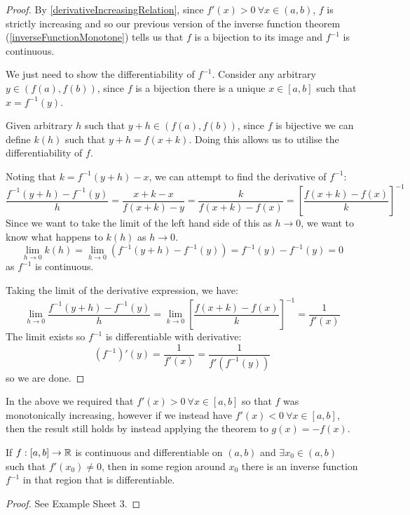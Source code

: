 \documentclass[../main.tex]{subfiles}
\begin{document}
\begin{proof}
  By \cref{derivativeIncreasingRelation}, since $f'(x) > 0\ \forall x \in (a, b)$, $f$ is strictly increasing and so our previous version of the inverse function theorem (\cref{inverseFunctionMonotone}) tells us that $f$ is a bijection to its image and $f^{-1}$ is continuous.

  We just need to show the differentiability of $f^{-1}$.
  Consider any arbitrary $y \in (f(a), f(b))$, since $f$ is a bijection there is a unique $x \in [a, b]$ such that $x = f^{-1}(y)$.

  Given arbitrary $h$ such that $y + h \in (f(a), f(b))$, since $f$ is bijective we can define $k(h)$ such that $y + h = f(x + k)$.
  Doing this allows us to utilise the differentiability of $f$.

  Noting that $k = f^{-1}(y + h) - x$, we can attempt to find the derivative of $f^{-1}$:
  \[
    \frac{f^{-1}(y + h) - f^{-1}(y)}{h} = \frac{x + k - x}{f(x + k) - y} = \frac{k}{f(x + k) - f(x)} = \left[\frac{f(x + k) - f(x)}{k}\right]^{-1}
  \]
  Since we want to take the limit of the left hand side of this as $h \to 0$, we want to know what happens to $k(h)$ as $h \to 0$.
  \[
    \lim_{h \to 0} k(h) = \lim_{h \to 0} (f^{-1}(y + h) - f^{-1}(y)) = f^{-1}(y) - f^{-1}(y) = 0
  \]
  as $f^{-1}$ is continuous.

  Taking the limit of the derivative expression, we have:
  \[
    \lim_{h \to 0} \frac{f^{-1}(y + h) - f^{-1}(y)}{h} = \lim_{k \to 0}  \left[\frac{f(x + k) - f(x)}{k}\right]^{-1} = \frac{1}{f'(x)}
  \]
  The limit exists so $f^{-1}$ is differentiable with derivative:
  \[
    (f^{-1})'(y) = \frac{1}{f'(x)} = \frac{1}{f'(f^{-1}(y))}
  \]
  so we are done.
\end{proof}
\begin{remark}
  In the above we required that $f'(x) > 0\ \forall x \in [a, b]$ so that $f$ was monotonically increasing, however if we instead have $f'(x) < 0\ \forall x \in [a, b]$, then the result still holds by instead applying the theorem to $g(x) = -f(x)$.
\end{remark}
\begin{proposition}
  If $f: [a, b] \to \mathbb{R}$ is continuous and differentiable on $(a, b)$ and $\exists x_0 \in (a, b)$ such that $f'(x_0) \neq 0$, then in some region around $x_0$ there is an inverse function $f^{-1}$ in that region that is differentiable.
\end{proposition}
\begin{proof}
  See Example Sheet 3.
\end{proof}
\end{document}
